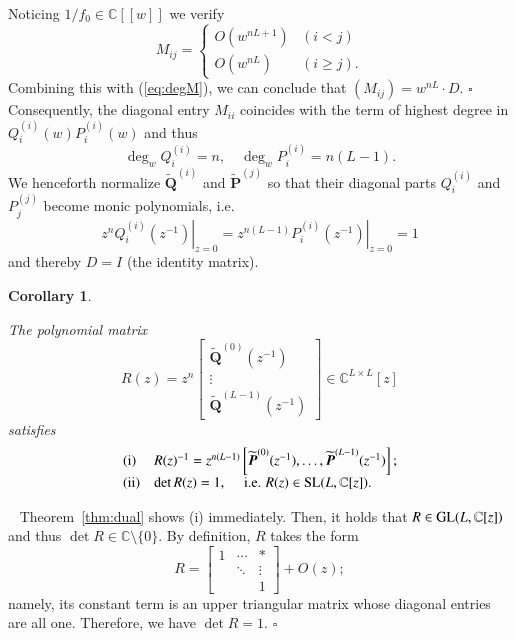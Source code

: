 \documentclass[12pt]{article}
\newtheorem{cor}[thm]{Corollary}
\numberwithin{equation}{section}
\def\pf{\noindent{\it Proof.} \ }
\def\qed{\hfill $\square$}
\begin{document}
Noticing $1/f_0 \in {\mathbb C}[\![w]\!]$ we verify 
\[
M_{ij} = \left\{ 
\begin{array}{ll}
O(w^{nL+1}) & (i <j)
\\
O(w^{nL})& (i \geq j).
\end{array}
\right.
\]
Combining  this with (\ref{eq:degM}),
we can conclude that
$(M_{ij}) = w^{nL} \cdot D$.
\qed
\\




Consequently, the diagonal entry $M_{ii}$
coincides with the term of highest degree in $Q_i^{(i)}(w)P_i^{(i)}(w)$
and thus
\begin{equation}
\label{eq:deg}
\deg_w Q_i^{(i)}=n, \quad \deg_w P_i^{(i)}=n(L-1).
\end{equation}
We henceforth normalize $\widetilde{\boldsymbol Q}^{(i)}$ and $\widetilde{\boldsymbol P}^{(j)}$
so that their diagonal parts 
 $Q^{(i)}_i$ and $P^{(j)}_j$ become
  monic polynomials,
 i.e.
 \[
\left. z^{n}Q^{(i)}_i(z^{-1}) \right|_{z=0}=
\left.z^{n(L-1)}P^{(i)}_i(z^{-1}) \right|_{z=0}=1
\]
and thereby $D= I$ (the identity matrix).



\begin{cor} \label{cor:R}

The polynomial matrix 
\begin{equation} \label{eq:smatrix}
R(z)
=
z^n
\begin{bmatrix} 
\widetilde{\boldsymbol Q}^{(0)}(z^{-1})
\\
\vdots
\\
\widetilde{\boldsymbol Q}^{(L-1)}(z^{-1})
\end{bmatrix}
\in {\mathbb C}^{L \times L}[z]
\end{equation}
satisfies
\[
\begin{array}{ll}
{\rm(i)} & 
R(z)^{-1}
=z^{n(L-1)}
\left[
\widetilde{\boldsymbol P}^{(0)}(z^{-1}), \ldots,
 \widetilde{\boldsymbol P}^{(L-1)}(z^{-1})\right];
 \\
 {\rm(ii)} &  \det R(z)=1,
 \quad
\text{ i.e. }R(z) \in {\rm SL}(L, {\mathbb C}[z]).
\end{array}
\]
\end{cor}

\pf
Theorem~\ref{thm:dual}
shows (i) immediately.
Then, it holds that $R \in {\rm GL}(L, {\mathbb C}[z])$
and thus $\det R \in {\mathbb C} \setminus \{0\}$.
By definition,
$R$  
takes the form
\begin{equation} \label{eq:R&R-1}
R=\begin{bmatrix}
1 &  \cdots &*\\  
&\ddots&  \vdots \\
&&1
\end{bmatrix} 
+O(z);
\end{equation}
namely, 
its constant term is an upper triangular matrix whose 
diagonal entries are all one.
Therefore, we have $\det R =1$.
\qed
\end{document}
